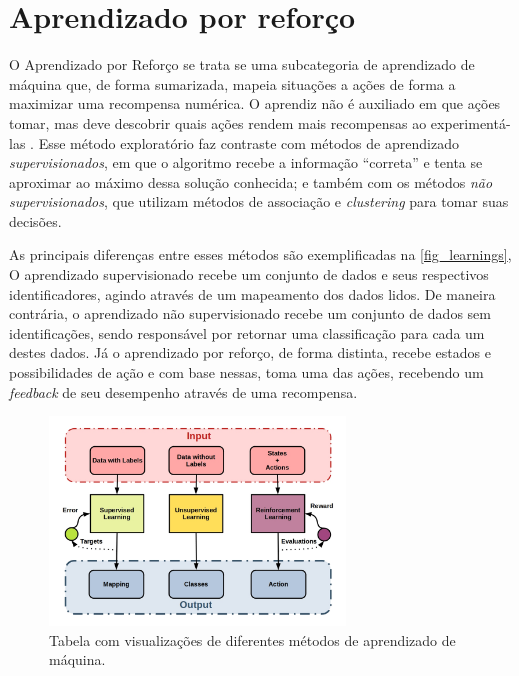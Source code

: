 \section{Aprendizado por refor{\c c}o}

O Aprendizado por Refor{\c c}o se trata se uma subcategoria de
aprendizado de m{\'a}quina que, de forma sumarizada, mapeia situa{\c
  c}{\~o}es a a{\c c}{\~o}es de forma a maximizar uma recompensa
num{\'e}rica. O aprendiz n{\~a}o {\'e} auxiliado em que a{\c c}{\~o}es
tomar, mas deve descobrir quais a{\c c}{\~o}es rendem mais recompensas
ao experiment{\'a}-las \cite{kaelbling1996}. Esse m{\'e}todo
explorat{\'o}rio faz contraste com m{\'e}todos de aprendizado
\textit{supervisionados}, em que o algoritmo recebe a informa{\c
  c}{\~a}o ``correta'' e tenta se aproximar ao m{\'a}ximo dessa
solu{\c c}{\~a}o conhecida; e tamb{\'e}m com os m{\'e}todos
\textit{n{\~a}o supervisionados}, que utilizam m{\'e}todos de
associa{\c c}{\~a}o e \textit{clustering} para tomar suas
decis{\~o}es. 

As principais diferen{\c c}as entre esses m{\'e}todos são exemplificadas na 
\autoref{fig_learnings}, O aprendizado supervisionado recebe um conjunto de dados
e seus respectivos identificadores, agindo através de um mapeamento dos dados lidos.
De maneira contrária, o aprendizado não supervisionado recebe um conjunto de dados 
sem identificações, sendo responsável por retornar uma classificação para cada um
destes dados. Já o aprendizado por reforço, de forma distinta, recebe estados e 
possibilidades de ação e com base nessas, toma uma das ações, recebendo um 
\textit{feedback} de seu desempenho através de uma recompensa. 

\begin{figure}[htb]
  \centering
  \caption{\label{fig_learnings}Tabela com visualiza{\c c}{\~o}es de diferentes m{\'e}todos de aprendizado de m{\'a}quina.}
  \includegraphics[width=0.7\textwidth]{images/unsupervised_supervised_reinforcement.jpeg}
\end{figure}

